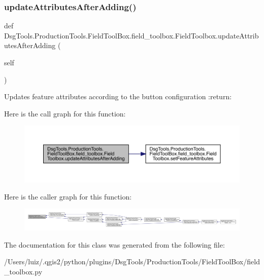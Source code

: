 \subsubsection{\texorpdfstring{update\+Attributes\+After\+Adding()}{updateAttributesAfterAdding()}}
{\footnotesize\ttfamily def Dsg\+Tools.\+Production\+Tools.\+Field\+Tool\+Box.\+field\+\_\+toolbox.\+Field\+Toolbox.\+update\+Attributes\+After\+Adding (\begin{DoxyParamCaption}\item[{}]{self }\end{DoxyParamCaption})}

\begin{DoxyVerb}Updates feature attributes according to the button configuration
:return:
\end{DoxyVerb}
 Here is the call graph for this function\+:
\nopagebreak
\begin{figure}[H]
\begin{center}
\leavevmode
\includegraphics[width=350pt]{class_dsg_tools_1_1_production_tools_1_1_field_tool_box_1_1field__toolbox_1_1_field_toolbox_a34c6f8bc997fd96fffcdf9ee5ed9f94b_cgraph}
\end{center}
\end{figure}
Here is the caller graph for this function\+:
\nopagebreak
\begin{figure}[H]
\begin{center}
\leavevmode
\includegraphics[width=350pt]{class_dsg_tools_1_1_production_tools_1_1_field_tool_box_1_1field__toolbox_1_1_field_toolbox_a34c6f8bc997fd96fffcdf9ee5ed9f94b_icgraph}
\end{center}
\end{figure}


The documentation for this class was generated from the following file\+:\begin{DoxyCompactItemize}
\item 
/\+Users/luiz/.\+qgis2/python/plugins/\+Dsg\+Tools/\+Production\+Tools/\+Field\+Tool\+Box/field\+\_\+toolbox.\+py\end{DoxyCompactItemize}
